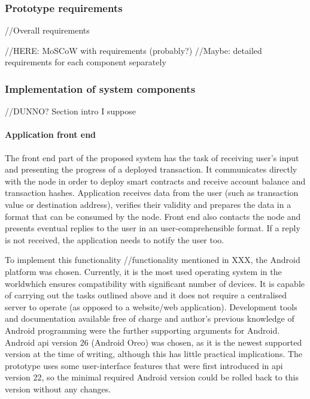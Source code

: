 \subsubsection{Prototype requirements}

//Overall requirements

//HERE: MoSCoW with requirements (probably?)
//Maybe: detailed requirements for each component separately

\subsubsection{Implementation of system components}

//DUNNO? Section intro I suppose

\paragraph{Application front end} 
The front end part of the proposed system has the task of receiving user's input and presenting the progress of a deployed transaction. It communicates directly with the node in order to deploy smart contracts and receive account balance and transaction hashes. Application receives data from the user (such as transaction value or destination address), verifies their validity and prepares the data in a format that can be consumed by the node. Front end also contacts the node and presents eventual replies to the user in an user-comprehensible format. If a reply is not received, the application needs to notify the user too.

To implement this functionality //functionality mentioned in XXX, the Android platform was chosen. Currently, it is the most used operating system in the world\footnotemark which ensures compatibility with significant number of devices. It is capable of carrying out the tasks outlined above and it does not require a centralised server to operate (as opposed to a website/web application). Development tools and documentation available free of charge and author's previous knowledge of Android programming were the further supporting arguments for Android. Android \acrshort{api} version 26 (Android Oreo) was chosen, as it is the newest supported version at the time of writing, although this has little practical implications. The prototype uses some user-interface features that were first introduced in \acrshort{api} version 22, so the minimal required Android version could be rolled back to this version without any changes.
% 

